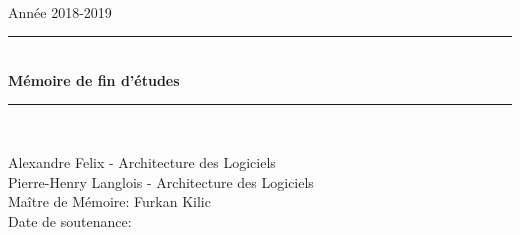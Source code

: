 \documentclass[12pt]{report}
\begin{document}
\begin{titlepage}
\begin{center}
\begin{figure}
\begin{minipage}{0.33\textwidth}
        \end{minipage}
    \end{figure}
    ~\\[3\baselineskip]
    {\large Année 2018-2019}\\[0.7cm]
    
    \rule{\linewidth}{0.5mm} \\[0.4cm]
    { \huge \bfseries Mémoire de fin d'études\\[0.4cm] }
    \rule{\linewidth}{0.5mm} \\[1.5cm]
    
    \end{center}
    {\large Alexandre Felix - Architecture des Logiciels}\\[0.3cm]
    {\large Pierre-Henry Langlois - Architecture des Logiciels}\\[0.3cm]
    {\large Maître de Mémoire: Furkan Kilic}\\[0.3cm]
    {\large Date de soutenance: }\\[0.3cm]
    \vfill
    \end{titlepage}
    \clearpage
    
    \renewcommand{\baselinestretch}{1.30}\small \normalsize
    \tableofcontents
    \renewcommand{\baselinestretch}{1.18}\small \normalsize
    
    
    
    
    \printglossaries
    \listoffigures
    
    
\end{document}
